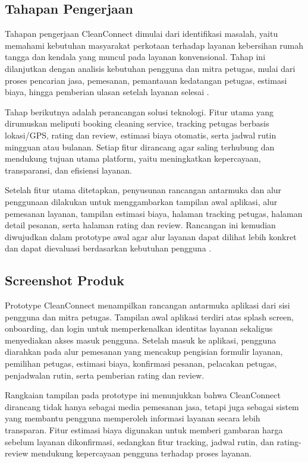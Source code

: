 \subsection{Tahapan Pengerjaan}

Tahapan pengerjaan CleanConnect dimulai dari identifikasi masalah, yaitu memahami kebutuhan masyarakat perkotaan terhadap layanan kebersihan rumah tangga dan kendala yang muncul pada layanan konvensional. Tahap ini dilanjutkan dengan analisis kebutuhan pengguna dan mitra petugas, mulai dari proses pencarian jasa, pemesanan, pemantauan kedatangan petugas, estimasi biaya, hingga pemberian ulasan setelah layanan selesai \cite{Nalendra2024}.

Tahap berikutnya adalah perancangan solusi teknologi. Fitur utama yang dirumuskan meliputi booking cleaning service, tracking petugas berbasis lokasi/GPS, rating dan review, estimasi biaya otomatis, serta jadwal rutin mingguan atau bulanan. Setiap fitur dirancang agar saling terhubung dan mendukung tujuan utama platform, yaitu meningkatkan kepercayaan, transparansi, dan efisiensi layanan.

Setelah fitur utama ditetapkan, penyusunan rancangan antarmuka dan alur penggunaan dilakukan untuk menggambarkan tampilan awal aplikasi, alur pemesanan layanan, tampilan estimasi biaya, halaman tracking petugas, halaman detail pesanan, serta halaman rating dan review. Rancangan ini kemudian diwujudkan dalam prototype awal agar alur layanan dapat dilihat lebih konkret dan dapat dievaluasi berdasarkan kebutuhan pengguna \cite{Nalendra2024}.

\subsection{Screenshot Produk}

Prototype CleanConnect menampilkan rancangan antarmuka aplikasi dari sisi pengguna dan mitra petugas. Tampilan awal aplikasi terdiri atas splash screen, onboarding, dan login untuk memperkenalkan identitas layanan sekaligus menyediakan akses masuk pengguna. Setelah masuk ke aplikasi, pengguna diarahkan pada alur pemesanan yang mencakup pengisian formulir layanan, pemilihan petugas, estimasi biaya, konfirmasi pesanan, pelacakan petugas, penjadwalan rutin, serta pemberian rating dan review.

Rangkaian tampilan pada prototype ini menunjukkan bahwa CleanConnect dirancang tidak hanya sebagai media pemesanan jasa, tetapi juga sebagai sistem yang membantu pengguna memperoleh informasi layanan secara lebih transparan. Fitur estimasi biaya digunakan untuk memberi gambaran harga sebelum layanan dikonfirmasi, sedangkan fitur tracking, jadwal rutin, dan rating-review mendukung kepercayaan pengguna terhadap proses layanan.

